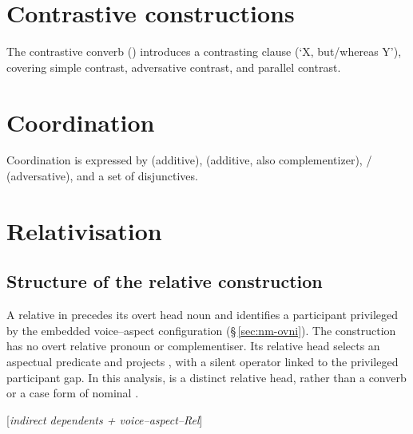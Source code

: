 \section{Contrastive constructions}\label{sec:contrastive}

The contrastive converb () introduces a contrasting clause (`X,
but/whereas Y'), covering simple contrast, adversative contrast, and parallel
contrast.

\section{Coordination}\label{sec:coordination}


Coordination is expressed by  (additive),  (additive, also
complementizer),  /  (adversative), and a set of disjunctives.

\section{Relativisation}
\label{sec:th-relativization}

\subsection{Structure of the relative construction}
\label{sec:th-rel-structure}

A relative in  precedes its overt head noun and identifies a
participant privileged by the embedded voice--aspect configuration
(§\,\ref{sec:nm-ovni}). The construction has no overt relative pronoun or
complementiser. Its relative head selects an aspectual predicate and projects
, with a silent operator linked to the privileged participant
gap. In this analysis,  is a distinct relative head, rather than a
converb or a case form of nominal .

\begin{center}
[\textit{indirect dependents + voice--aspect--Rel}]
\end{center}

